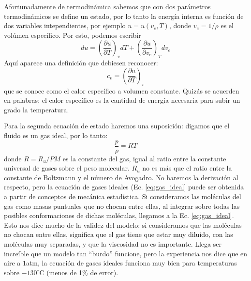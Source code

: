 Afortunadamente de termodinámica sabemos que con dos parámetros termodinámicos se define un estado, por lo tanto la energía interna es función de dos variables intependientes, por ejemplo $u=u(v_e,T)$, donde $v_e=1/\rho$ es el volúmen específico.
Por esto, podemos escribir
%
\begin{equation}\label{eq:denergia_interna}
du = \left(\frac{\partial u}{\partial T}\right)_vdT + \left(\frac{\partial u}{\partial v_e}\right)_Tdv_e
\end{equation}
%
Aquí aparece una definición que debiesen reconocer:
%
\begin{equation}
c_v = \left(\frac{\partial u}{\partial T}\right)_v
\end{equation}
%
que se conoce como el calor específico a volumen constante.
Quizás se acuerden en palabras: el calor específico es la cantidad de energía necesaria para subir un grado la temperatura.

Para la segunda ecuación de estado haremos una suposición: digamos que el fluido es un gas ideal, por lo tanto:
%
\begin{equation}\label{eq:gas_ideal}
\frac{p}{\rho} = RT
\end{equation}
%
donde $R=R_u/PM$ es la constante del gas, igual al ratio entre la constante  universal de gases sobre el peso molecular.
$R_u$ no es más que el ratio entre la constante de Boltzmann y el número de Avogadro.
No haremos la derivación al respecto, pero la ecuación de gases ideales (Ec. \eqref{eq:gas_ideal} puede ser obtenida a partir de conceptos de mecánica estadística. 
Si consideramos las moléculas del gas como masas puntuales que no chocan entre ellas, al integrar sobre todas las posibles conformaciones de dichas moléculas, llegamos a la Ec. \eqref{eq:gas_ideal}.
Esto nos dice mucho de la validez del modelo: si consideramos que las moléculas no chocan entre ellas, significa que el gas tiene que estar muy diluído, con las moléculas muy separadas, y que la viscosidad no es importante.
Llega ser increíble que un modelo tan ``burdo'' funcione, pero la experiencia nos dice que en aire a $1$atm, la ecuación de gases ideales funciona muy bien para temperaturas sobre $-130^\circ$C (menos de 1\% de error).

